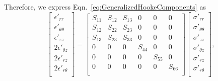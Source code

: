 \documentclass[preprint,10pt,times]{elsarticle}
\numberwithin{equation}{section}
\renewcommand{\>}{$\Rightarrow$}
\begin{document}
Therefore, we express Eqn.~\eqref{eq:GeneralizedHookeComponents} as
\begin{equation}
	\left[
		\begin{array}{c}
		\epsilon'_{rr} \\ \epsilon'_{\theta\theta} \\ \epsilon'_{zz} \\
		2\epsilon'_{\theta z} \\ 2\epsilon'_{r z} \\ 2\epsilon'_{r \theta} \\
		\end{array}
	\right]
	=
	\left[
		\begin{array}{cccccc}
		 S_{11} & S_{12} & S_{13} & 0 & 0 & 0 \\
		 S_{12} & S_{22} & S_{23} & 0 & 0 & 0 \\
		 S_{13} & S_{23} & S_{33} & 0 & 0 & 0 \\
		 0 & 0 & 0 & S_{44} & 0 & 0 \\
		 0 & 0 & 0 & 0 & S_{55} & 0 \\
		 0 & 0 & 0 & 0 & 0 & S_{66} \\
		\end{array}
	\right]
	\left[
		\begin{array}{c}
		\sigma'_{rr} \\ \sigma'_{\theta\theta} \\ \sigma'_{zz} \\
		\sigma'_{\theta z} \\ \sigma'_{r z} \\ \sigma'_{r \theta} \\
		\end{array}
	\right],
\end{equation}
\end{document}

